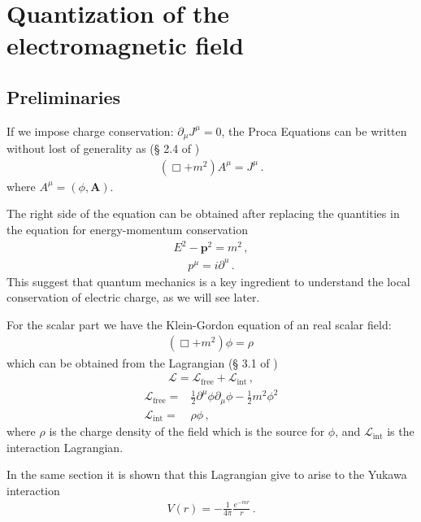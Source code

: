 \chapter{Quantization of the electromagnetic field}

\section{Preliminaries}

If we impose charge conservation: $\partial_\mu J^\mu=0$, the Proca Equations can be written without lost of generality as (\S{} 2.4 of \cite{lsm})
\begin{align}
  (\Box+m^2)A^\mu=J^\mu\,.
\end{align}
where $A^\mu=(\phi,\mathbf{A})$.

The right side of the equation can be obtained after replacing the quantities in the equation for energy-momentum conservation
\begin{align}
  E^2-\mathbf{p}^2=m^2\,,
\end{align}
\begin{align}
  p^\mu=i\partial^u\,.
\end{align}
This suggest that quantum mechanics is a key ingredient to understand the local conservation of electric charge, as we will see later.


For the scalar part we have the Klein-Gordon equation of an real scalar field:
\begin{align}
   (\Box+m^2)\phi=\rho\,
\end{align}
which can be obtained from the Lagrangian (\S{} 3.1 of \cite{lsm})
\begin{align}
  \mathcal{L}=\mathcal{L}_{\text{free}}+\mathcal{L}_{\text{int}}\,,
\end{align}
\begin{align}
\mathcal{L}_{\text{free}}=&\frac{1}{2}\partial^\mu\phi\partial_\mu\phi-\frac{1}{2}m^2\phi^2\nonumber\\
\mathcal{L}_{\text{int}}=&\rho\phi\,,
\end{align}
where $\rho$ is the charge density of the field which is the source for $\phi$, and $\mathcal{L}_{\text{int}}$ is the interaction Lagrangian.

In the same section it is shown that this Lagrangian give to arise to the Yukawa interaction
\begin{align}
  V(r)=-\frac{1}{4\pi}\frac{e^{-m r}}{r}\,.
\end{align}

